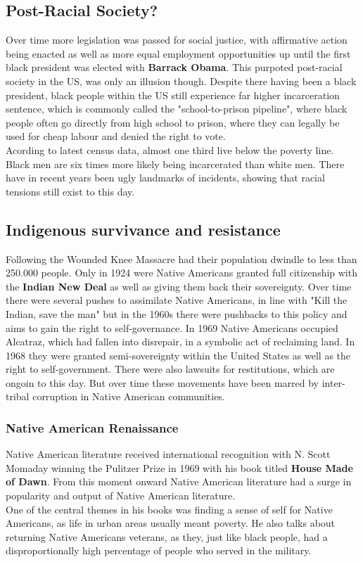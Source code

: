 \documentclass{article}
\begin{document}
	\subsection{Post-Racial Society?}
	Over time more legislation was passed for social justice, with affirmative action being enacted as well as more equal employment opportunities up until the first black president was elected with \textbf{Barrack Obama}. This purpoted post-racial society in the US, was only an illusion though. Despite there having been a black president, black people within the US still experience far higher incarceration sentence, which is commonly called the "school-to-prison pipeline", where black people often go directly from high school to prison, where they can legally be used for cheap labour and denied the right to vote. \\
	Acording to latest census data, almost one third live below the poverty line. Black men are six times more likely being incarcerated than white men. There have in recent years been ugly landmarks of incidents, showing that racial tensions still exist to this day. \\
	\subsection{Indigenous survivance and resistance}
	Following the Wounded Knee Massacre had their population dwindle to less than 250.000 people. Only in 1924 were Native Americans granted full citizenship with the \textbf{Indian New Deal} as well as giving them back their sovereignty. Over time there were several pushes to assimilate Native Americans, in line with "Kill the Indian, save the man" but in the 1960s there were pushbacks to this policy and aims to gain the right to self-governance. In 1969 Native Americans occupied Alcatraz, which had fallen into disrepair, in a symbolic act of reclaiming land. In 1968 they were granted semi-sovereignty within the United States as well as the right to self-government. There were also lawsuits for restitutions, which are ongoin to this day. But over time these movements have been marred by inter-tribal corruption in Native American communities. \\
	\subsubsection{Native American Renaissance}
	Native American literature received international recognition with N. Scott Momaday winning the Pulitzer Prize in 1969 with his book titled \textbf{House Made of Dawn}. From this moment onward Native American literature had a surge in popularity and output of Native American literature. \\
	One of the central themes in his books was finding a sense of self for Native Americans, as life in urban areas usually meant poverty. He also talks about returning Native Americans veterans, as they, just like black people, had a disproportionally high percentage of people who served in the military. \\
\end{document}
